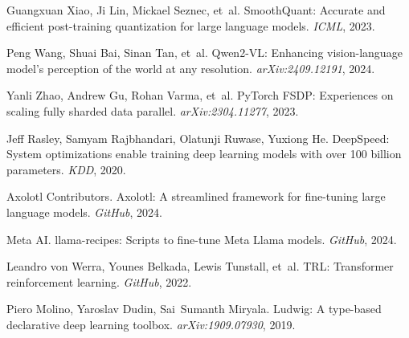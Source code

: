 \documentclass[11pt,letterpaper]{article}
\begin{document}
\begin{thebibliography}{99}
Guangxuan Xiao, Ji Lin, Mickael Seznec, et~al.
\newblock SmoothQuant: Accurate and efficient post-training quantization for large language models.
\newblock \emph{ICML}, 2023.

Peng Wang, Shuai Bai, Sinan Tan, et~al.
\newblock Qwen2-VL: Enhancing vision-language model's perception of the world at any resolution.
\newblock \emph{arXiv:2409.12191}, 2024.

Yanli Zhao, Andrew Gu, Rohan Varma, et~al.
\newblock PyTorch FSDP: Experiences on scaling fully sharded data parallel.
\newblock \emph{arXiv:2304.11277}, 2023.

Jeff Rasley, Samyam Rajbhandari, Olatunji Ruwase, Yuxiong He.
\newblock DeepSpeed: System optimizations enable training deep learning models with over 100 billion parameters.
\newblock \emph{KDD}, 2020.

Axolotl Contributors.
\newblock Axolotl: A streamlined framework for fine-tuning large language models.
\newblock \emph{GitHub}, 2024.

Meta AI.
\newblock llama-recipes: Scripts to fine-tune Meta Llama models.
\newblock \emph{GitHub}, 2024.

Leandro von Werra, Younes Belkada, Lewis Tunstall, et~al.
\newblock TRL: Transformer reinforcement learning.
\newblock \emph{GitHub}, 2022.

Piero Molino, Yaroslav Dudin, Sai~Sumanth Miryala.
\newblock Ludwig: A type-based declarative deep learning toolbox.
\newblock \emph{arXiv:1909.07930}, 2019.

\end{thebibliography}
\end{document}
